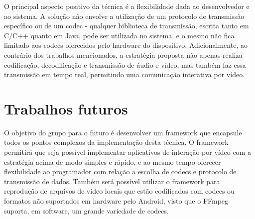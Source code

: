 \documentclass{acm_proc_article-sp}
\begin{document}
O principal aspecto positivo da técnica é a flexibilidade dada ao desenvolvedor e ao sistema. A solução não envolve a utilização de um protocolo de transmissão específico ou de um codec - qualquer biblioteca de transmissão, escrita tanto em C/C++ quanto em Java, pode ser utilizada no sistema, e o mesmo não fica limitado aos codecs oferecidos pelo hardware do dispositivo. Adicionalmente, ao contrário dos trabalhos mencionados, a estratégia proposta não apenas realiza codificação, decodificação e transmissão de áudio e vídeo, mas também faz essa transmissão em tempo real, permitindo uma comunicação interativa por vídeo.

\section{Trabalhos futuros}

O objetivo do grupo para o futuro é desenvolver um framework que encapsule todos os pontos complexos da implementação desta técnica. O framework permitirá que seja possível implementar aplicativos de interação por vídeo com a estratégia acima de modo simples e rápido, e ao mesmo tempo oferecer flexibilidade ao programador com relação a escolha de codecs e protocolo de transmissão de dados. Também será possível utilizar o framework para reprodução de arquivos de vídeo locais que estão codificados com codecs ou formatos não suportados em hardware pelo Android, visto que o FFmpeg suporta, em software, um grande variedade de codecs.

%

%
%
\balancecolumns
\end{document}

